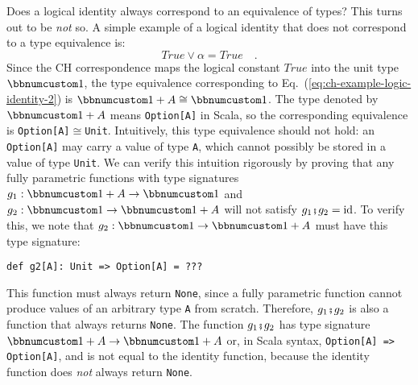 Does a logical identity always correspond to an equivalence of types?
This turns out to be \emph{not} so. A simple example of a logical
identity that does not correspond to a type equivalence is:
\begin{equation}
True\vee\alpha=True\quad.\label{eq:ch-example-logic-identity-2}
\end{equation}
Since the CH correspondence maps the logical constant $True$ into
the unit type $\bbnum 1$, the type equivalence corresponding to Eq.~(\ref{eq:ch-example-logic-identity-2})
is $\bbnum 1+A\cong\bbnum 1$. The type denoted by $\bbnum 1+A$ means
\lstinline!Option[A]! in Scala, so the corresponding equivalence
is \lstinline!Option[A]!$\cong$\lstinline!Unit!. Intuitively, this
type equivalence should not hold: an \lstinline!Option[A]! may carry
a value of type \lstinline!A!, which cannot possibly be stored in
a value of type \lstinline!Unit!. We can verify this intuition rigorously
by proving that any fully parametric functions with type signatures
$g_{1}:\bbnum 1+A\rightarrow\bbnum 1$ and $g_{2}:\bbnum 1\rightarrow\bbnum 1+A$
will not satisfy $g_{1}\bef g_{2}=\text{id}$. To verify this, we
note that $g_{2}:\bbnum 1\rightarrow\bbnum 1+A$ must have this type
signature:
\begin{lstlisting}
def g2[A]: Unit => Option[A] = ???
\end{lstlisting}
This function must always return \lstinline!None!, since a fully
parametric function cannot produce values of an arbitrary type \lstinline!A!
from scratch. Therefore, $g_{1}\bef g_{2}$ is also a function that
always returns \lstinline!None!. The function $g_{1}\bef g_{2}$
has type signature $\bbnum 1+A\rightarrow\bbnum 1+A$ or, in Scala
syntax, \lstinline!Option[A] => Option[A]!, and is not equal to the
identity function, because the identity function does \emph{not} always
return \lstinline!None!.

